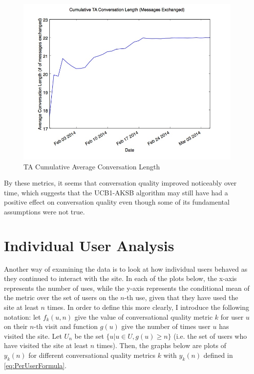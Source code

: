 \begin{figure}[H]
\centering
\includegraphics[trim= 0mm 0mm 0mm 0mm, clip, scale=0.5]{./Figures/CumulativeTAConversationLength(MessagesExchanged).jpg}
\caption{TA Cumulative Average Conversation Length}
\label{fig:TAMessagesExchangedCumulative}
\end{figure}

By these metrics, it seems that conversation quality improved noticeably over time, which suggests that the UCB1-AKSB algorithm may still have had a positive effect on conversation quality even though some of its fundamental assumptions were not true.

\section{Individual User Analysis}
\label{sec:IndividualUserAnalysis}

Another way of examining the data is to look at how individual users behaved as they continued to interact with the site. In each of the plots below, the x-axis represents the number of uses, while the y-axis represents the conditional mean of the metric over the set of users on the $n$-th use, given that they have used the site at least $n$ times. In order to define this more clearly, I introduce the following notation: let $f_k(u, n)$ give the value of conversational quality metric $k$ for user $u$ on their $n$-th visit and function $g(u)$ give the number of times user $u$ has visited the site. Let $U_n$ be the set $\{u | u \in {U}, g(u) \geq{n}\}$ (i.e. the set of users who have visited the site at least $n$ times). Then, the graphs below are plots of $y_k(n)$ for different conversational quality metrics $k$ with $y_k(n)$ defined in \autoref{eq:PerUserFormula}.

